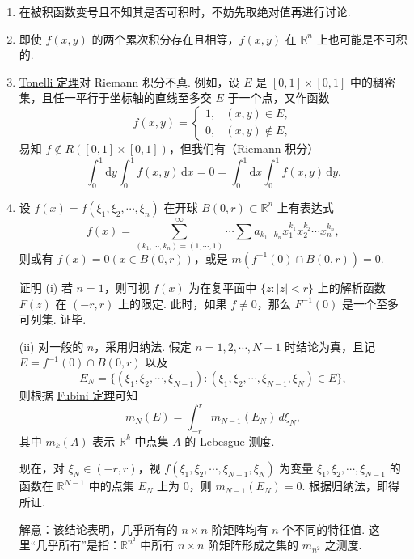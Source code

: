 \documentclass[../../main.tex]{subfiles}%
\begin{document}
\begin{remark}
\begin{enumerate}
\item 在被积函数变号且不知其是否可积时，不妨先取绝对值再进行讨论.

\item 即使 \( f(x, y) \) 的两个累次积分存在且相等，\( f(x, y) \) 在 \( \mathbb{R}^n \) 上也可能是不可积的.

\item \hyperref[theorem:Tonelli 定理 非负可测函数的情形]{Tonelli 定理}对 Riemann 积分不真. 例如，设 \( E \) 是 \( [0, 1] \times [0, 1] \) 中的稠密集，且任一平行于坐标轴的直线至多交 \( E \) 于一个点，又作函数
\[
f(x, y) = 
\begin{cases} 
1, & (x, y) \in E, \\
0, & (x, y) \notin E,
\end{cases}
\]
易知 \( f \notin R([0, 1] \times [0, 1]) \)，但我们有（Riemann 积分）
\[
\int_0^1 \mathrm{d}y \int_0^1 f(x, y) \, \mathrm{d}x = 0 = \int_0^1 \mathrm{d}x \int_0^1 f(x, y) \, \mathrm{d}y.
\]

\item 设 \( f(x) = f(\xi_1, \xi_2, \cdots, \xi_n) \) 在开球 \( B(0, r) \subset \mathbb{R}^n \) 上有表达式
\[
f(x) = \sum_{(k_1, \cdots, k_n) = (1, \cdots, 1)}^{\infty} \cdots \sum a_{k_1 \cdots k_n} x_1^{k_1} x_2^{k_2} \cdots x_n^{k_n},
\]
则或有 \( f(x) = 0 (x \in B(0, r)) \)，或是 \( m(f^{-1}(0) \cap B(0, r)) = 0 \).

证明 (i) 若 \( n = 1 \)，则可视 \( f(x) \) 为在复平面中 \( \{ z : |z| < r \} \) 上的解析函数 \( F(z) \) 在 \( (-r, r) \) 上的限定. 此时，如果 \( f \neq 0 \)，那么 \( F^{-1}(0) \) 是一个至多可列集. 证毕.

(ii) 对一般的 \( n \)，采用归纳法. 假定 \( n = 1, 2, \cdots, N - 1 \) 时结论为真，且记 \( E = f^{-1}(0) \cap B(0, r) \) 以及
\[
E_N = \{ (\xi_1, \xi_2, \cdots, \xi_{N - 1}) : (\xi_1, \xi_2, \cdots, \xi_{N - 1}, \xi_N) \in E \},
\]
则根据 \hyperref[theorem:Fubini定理 可积函数的情形]{Fubini 定理}可知
\[
m_N(E) = \int_{-r}^r m_{N - 1}(E_N) \, d\xi_N,
\]
其中 \( m_k(A) \) 表示 \( \mathbb{R}^k \) 中点集 \( A \) 的 Lebesgue 测度.

现在，对 \( \xi_N \in (-r, r) \)，视 \( f(\xi_1, \xi_2, \cdots, \xi_{N - 1}, \xi_N) \) 为变量 \( \xi_1, \xi_2, \cdots, \xi_{N - 1} \) 的函数在 \( \mathbb{R}^{N - 1} \) 中的点集 \( E_N \) 上为 0，则 \( m_{N - 1}(E_N) = 0 \). 根据归纳法，即得所证.

解意：该结论表明，几乎所有的 \( n \times n \) 阶矩阵均有 \( n \) 个不同的特征值. 这里“几乎所有”是指：\( \mathbb{R}^{n^2} \) 中所有 \( n \times n \) 阶矩阵形成之集的 \( m_{n^2} \) 之测度.
\end{enumerate}
\end{remark}
\end{document}
